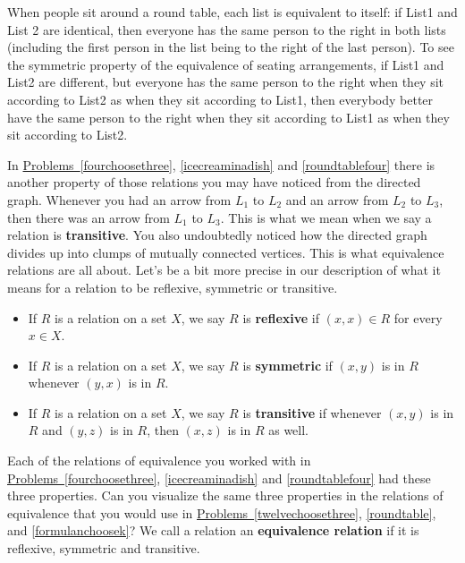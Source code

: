 \documentclass[10pt,]{book}
\newcommand{\terminology}[1]{\textbf{#1}}
\theoremstyle{plain}
\theoremstyle{definition}
\theoremstyle{definition}
\numberwithin{equation}{chapter}
\begin{document}
\par
When people sit around a round table, each list is equivalent to itself: if List1 and List 2 are identical, then everyone has the same person to the right in both lists (including the first person in the list being to the right of the last person). To see the symmetric property of the equivalence of seating arrangements, if List1 and List2 are different, but everyone has the same person to the right when they sit according to List2 as when they sit according to List1, then everybody better have the same person to the right when they sit according to List1 as when they sit according to List2.%
\par
In \hyperref[fourchoosethree]{Problems~\ref{fourchoosethree}}, \hyperref[icecreaminadish]{\ref{icecreaminadish}} and \hyperref[roundtablefour]{\ref{roundtablefour}} there is another property of those relations you may have noticed from the directed graph. Whenever you had an arrow from \(L_1\) to \(L_2\) and an arrow from \(L_2\) to \(L_3\), then there was an arrow from \(L_1\) to \(L_3\). This is what we mean when we say a relation is \terminology{transitive}. You also undoubtedly noticed how the directed graph divides up into clumps of mutually connected vertices. This is what equivalence relations are all about. Let's be a bit more precise in our description of what it means for a relation to be reflexive, symmetric or transitive. \leavevmode%
\begin{itemize}[label=\textbullet]
\item{}If \(R\) is a relation on a set \(X\), we say \(R\) is \terminology{reflexive}  if \((x,x)\in
R\) for every \(x\in X\).%
\item{}If \(R\) is a relation on a set \(X\), we say \(R\) is \terminology{symmetric} if \((x,y)\) is in \(R\) whenever \((y,x)\) is in \(R\).%
\item{}If \(R\) is a relation on a set \(X\), we say \(R\) is \terminology{transitive} if whenever \((x,y)\) is in \(R\) and \((y,z)\) is in \(R\), then \((x,z)\) is in \(R\) as well.%
\end{itemize}
%
\par
Each of the relations of equivalence you worked with in \hyperref[fourchoosethree]{Problems~\ref{fourchoosethree}}, \hyperref[icecreaminadish]{\ref{icecreaminadish}} and \hyperref[roundtablefour]{\ref{roundtablefour}} had these three properties. Can you visualize the same three properties in the relations of equivalence that you would use in \hyperref[twelvechoosethree]{Problems~\ref{twelvechoosethree}}, \hyperref[roundtable]{\ref{roundtable}}, and \hyperref[formulanchoosek]{\ref{formulanchoosek}}? We call a relation an \terminology{equivalence relation} if it is reflexive, symmetric and transitive.%
\end{document}
